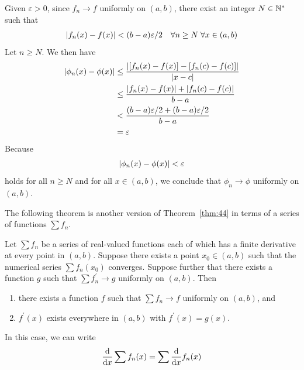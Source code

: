 \documentclass[thmcnt=section, 12pt]{my-elegantbook}
\begin{document}
\begin{solution}
    Given $\varepsilon > 0$, since $f_n \to f$ uniformly on $(a, b)$, there exist an integer $N \in \mathbb{N}^\ast$ such that 
    \begin{align*}
        \left\lvert f_n(x) - f(x) \right\rvert < (b - a) \varepsilon / 2
        \quad \forall n \geq N \;
        \forall x \in (a, b)
    \end{align*}
    Let $n \geq N$. We then have
    \begin{align*}
        \left\lvert \phi_n(x) - \phi(x) \right\rvert
        &\leq \frac{\left\lvert  [f_n(x) - f(x)] - [f_n(c) - f(c)]  \right\rvert}{\left\lvert x - c \right\rvert} \\ 
        &\leq \frac{\left\lvert f_n(x) - f(x) \right\rvert + \left\lvert f_n(c) - f(c) \right\rvert}{b - a} \\
        &< \frac{(b - a) \varepsilon / 2 + (b - a) \varepsilon / 2}{b - a} \\
        &= \varepsilon
    \end{align*}
    Because 
    \begin{align*}
        \left\lvert \phi_n(x) - \phi(x) \right\rvert < \varepsilon
    \end{align*}
    holds for all $n \geq N$ and for all $x \in (a, b)$, we conclude that $\phi_n \to \phi$ uniformly on $(a, b)$.
\end{solution}


The following theorem is another version of Theorem~\ref{thm:44} in terms of a series of functions $\sum f_n$.

\begin{theorem} \label{thm:45}
    Let $\sum f_n$ be a series of real-valued functions each of which has a finite derivative at every point in $(a, b)$. Suppose there exists a point $x_0 \in (a, b)$ such that the numerical series $\sum f_n(x_0)$ converges. Suppose further that there exists a function $g$ such that $\sum f^\prime_n \to g$ uniformly on $(a, b)$. Then 
    \begin{enumerate}
        \item there exists a function $f$ such that $\sum f_n \to f$ uniformly on $(a, b)$, and
        \item $f^\prime(x)$ exists everywhere in $(a, b)$ with $f^\prime(x) = g(x)$.
    \end{enumerate}
    In this case, we can write
    \begin{align}
        \odvs{\sum f_n(x)}{x}
        = \sum \odvs{f_n(x)}{x}
        \label{eq:103}
    \end{align}
\end{theorem}
\end{document}
